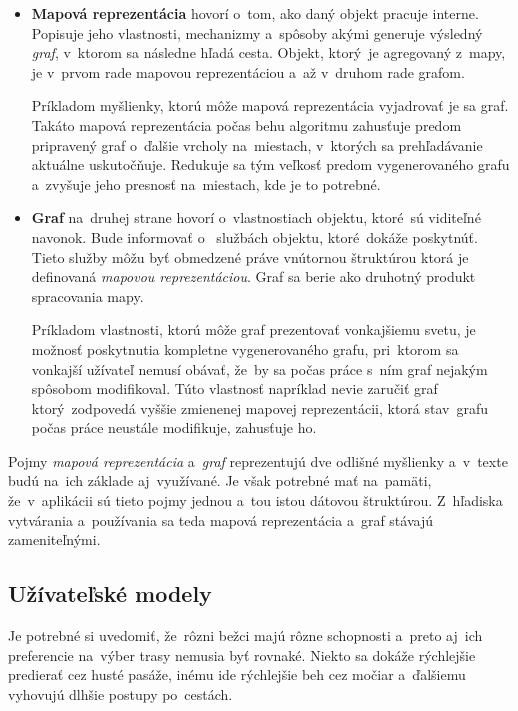 \begin{itemize}
    \item \textbf{Mapová reprezentácia} hovorí o~tom, ako daný objekt pracuje interne. Popisuje jeho vlastnosti, mechanizmy a~spôsoby akými generuje výsledný \textit{graf}, v~ktorom sa následne hľadá cesta. Objekt, ktorý~je agregovaný z~mapy, je v~prvom rade mapovou reprezentáciou a~až v~druhom rade grafom.
    
    Príkladom myšlienky, ktorú môže mapová reprezentácia vyjadrovať je  sa graf. Takáto mapová reprezentácia počas behu algoritmu zahusťuje predom pripravený graf o~ďalšie vrcholy na~miestach, v~ktorých sa prehľadávanie aktuálne uskutočňuje. Redukuje sa tým veľkosť predom vygenerovaného grafu a~zvyšuje jeho presnosť na~miestach, kde je to potrebné.   
    \item\textbf{Graf} na~druhej strane hovorí o~vlastnostiach objektu, ktoré~sú viditeľné navonok. Bude informovať o~ službách objektu, ktoré~dokáže poskytnúť. Tieto služby môžu byť obmedzené práve vnútornou štruktúrou ktorá je definovaná \textit{mapovou reprezentáciou}. Graf sa berie ako druhotný produkt spracovania mapy.   

    Príkladom vlastnosti, ktorú môže graf prezentovať vonkajšiemu svetu, je možnosť poskytnutia kompletne vygenerovaného grafu, pri~ktorom sa vonkajší užívateľ nemusí obávať, že~by sa počas práce s~ním graf nejakým spôsobom modifikoval. Túto vlastnosť napríklad nevie zaručiť graf ktorý~zodpovedá vyššie zmienenej mapovej reprezentácii, ktorá stav~grafu počas práce neustále modifikuje, zahusťuje ho.
\end{itemize}

Pojmy \textit{mapová reprezentácia} a~\textit{graf} reprezentujú dve odlišné myšlienky a~v~texte budú na~ich základe aj~využívané. Je však potrebné mať na~pamäti, že~v~aplikácii sú tieto pojmy jednou a~tou istou dátovou štruktúrou. Z~hľadiska vytvárania a~používania sa teda mapová reprezentácia a~graf stávajú zameniteľnými.

\subsection{Užívateľské modely}\label{uzivatelske_modely}

Je potrebné si uvedomiť, že~rôzni bežci majú rôzne schopnosti a~preto aj~ich preferencie na~výber trasy nemusia byť rovnaké. Niekto sa dokáže rýchlejšie predierať cez husté pasáže, inému ide rýchlejšie beh cez močiar a~ďalšiemu vyhovujú dlhšie postupy po~cestách. 


